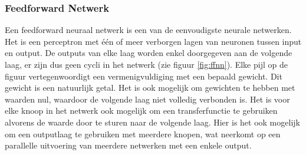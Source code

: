 \subsubsection{Feedforward Netwerk}
\label{par:concept}
Een feedforward neuraal netwerk is een van de eenvoudigste neurale netwerken. Het is een perceptron met \'e\'en of meer verborgen lagen van neuronen tussen input en output. De outputs van elke laag worden enkel doorgegeven aan de volgende laag, er zijn dus geen cycli in het netwerk (zie figuur \ref{fig:ffnn}). Elke pijl op de figuur vertegenwoordigt een vermenigvuldiging met een bepaald gewicht. Dit gewicht is een natuurlijk getal. Het is ook mogelijk om gewichten te hebben met waarden nul, waardoor de volgende laag niet volledig verbonden is. Het is voor elke knoop in het netwerk ook mogelijk om een transferfunctie te gebruiken alvorens de waarde door te sturen naar de volgende laag. Hier is het ook mogelijk om een outputlaag te gebruiken met meerdere knopen, wat neerkomt op een parallelle uitvoering van meerdere netwerken met een enkele output\cite{Bishop:1995:NNP:525960}.

